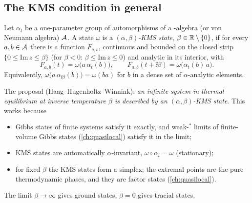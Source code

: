 \subsection{The KMS condition in general}

\begin{definition}
Let $\alpha_t$ be a one-parameter group of automorphisms of a \cstar-algebra (or von Neumann algebra) $\mathcal{A}$. A state $\omega$ is a \emph{$(\alpha,\beta)$-KMS state}, $\beta\in\mathbb{R}\setminus\{0\}$, if for every $a,b\in\mathcal{A}$ there is a function $F_{a,b}$, continuous and bounded on the closed strip $\{0\le\mathrm{Im}\,z\le\beta\}$ (for $\beta<0$: $\beta\le\mathrm{Im}\,z\le0$) and analytic in its interior, with
\begin{equation}
F_{a,b}(t)=\omega\big(a\,\alpha_t(b)\big),\qquad F_{a,b}(t+\ii\beta)=\omega\big(\alpha_t(b)\,a\big).
\end{equation}
Equivalently, $\omega\big(a\,\alpha_{\ii\beta}(b)\big)=\omega(ba)$ for $b$ in a dense set of $\alpha$-analytic elements.
\end{definition}

The proposal (Haag--Hugenholtz--Winnink): \emph{an infinite system in thermal equilibrium at inverse temperature $\beta$ is described by an $(\alpha,\beta)$-KMS state}. This works because
\begin{itemize}
\item Gibbs states of finite systems satisfy it exactly, and weak-$^*$ limits of finite-volume Gibbs states (\cref{ch:quasilocal}) satisfy it in the limit;
\item KMS states are automatically $\alpha$-invariant, $\omega\circ\alpha_t=\omega$ (stationary);
\item for fixed $\beta$ the KMS states form a simplex; the extremal points are the pure thermodynamic phases, and they are factor states (\cref{ch:quasilocal}).
\end{itemize}
The limit $\beta\to\infty$ gives ground states; $\beta=0$ gives tracial states.

